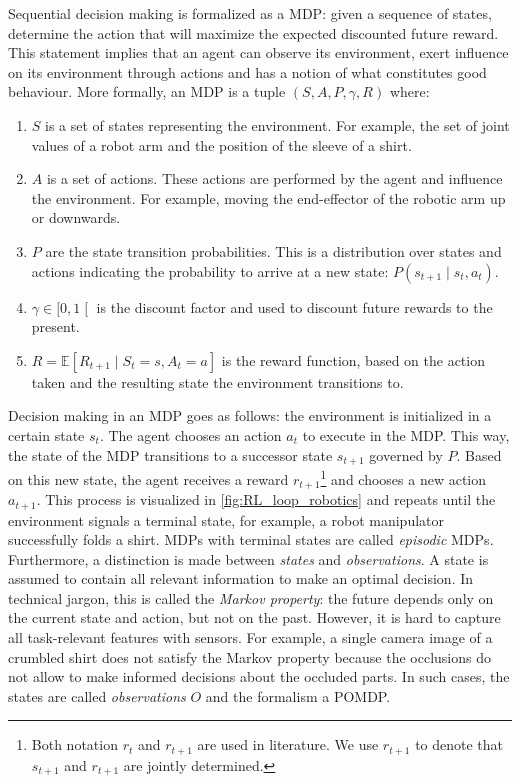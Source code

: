 \documentclass[\home/main.tex]{subfiles}
\begin{document}
Sequential decision making is formalized as a \gls{MDP}: given a sequence of states, determine the action that will maximize the expected discounted future reward. This statement implies that an agent can observe its environment, exert influence on its environment through actions and has a notion of what constitutes good behaviour. More formally, an \gls{MDP} is a tuple $\left(S, A,P, \gamma, R\right)$ where:
\begin{enumerate}
	\item $S$ is a set of states representing the environment. For example, the set of joint values of a robot arm and the position of the sleeve of a shirt.
	\item $A$ is a set of actions. These actions are performed by the agent and influence the environment. For example, moving the end-effector of the robotic arm up or downwards.
	\item $P$ are the state transition probabilities. This is a distribution over states and actions indicating the probability to arrive at a new state: $P\left(s_{t+1} \mid s_{t}, a_{t}\right)$.
	\item $\gamma \in \mathopen[0, 1\mathclose[$ is the discount factor and used to discount future rewards to the present.
	\item $R = \mathbb{E}[R_{t+1} \mid S_t=s, A_t=a]$ is the reward function, based on the action taken and the resulting state the environment transitions to.
\end{enumerate}
Decision making in an MDP goes as follows: the environment is initialized in a certain state $s_t$. The agent chooses an action $a_t$ to execute in the MDP. This way, the state of the MDP transitions to a successor state $s_{t+1}$ governed by $P$. Based on this new state, the agent receives a reward $r_{t+1}$\footnote{Both notation $r_{t}$ and $r_{t+1}$ are used in literature. We use $r_{t+1}$ to denote that $s_{t+1}$ and $r_{t+1}$ are jointly determined.} and chooses a new action $a_{t+1}$. This process is visualized in \cref{fig:RL_loop_robotics} and repeats until the environment signals a terminal state, for example, a robot manipulator successfully folds a shirt. \Glspl{MDP} with terminal states are called \emph{episodic} \glspl{MDP}. Furthermore, a distinction is made between \emph{states} and \emph{observations}. A state is assumed to contain all relevant information to make an optimal decision. In technical jargon, this is called the \emph{Markov property}: the future depends only on the current state and action, but not on the past. However, it is hard to capture all task-relevant features with sensors. For example, a single camera image of a crumbled shirt does not satisfy the Markov property because the occlusions do not allow to make informed decisions about the occluded parts. In such cases, the states are called \emph{observations} $O$ and the formalism a \gls{POMDP}.
\end{document}
